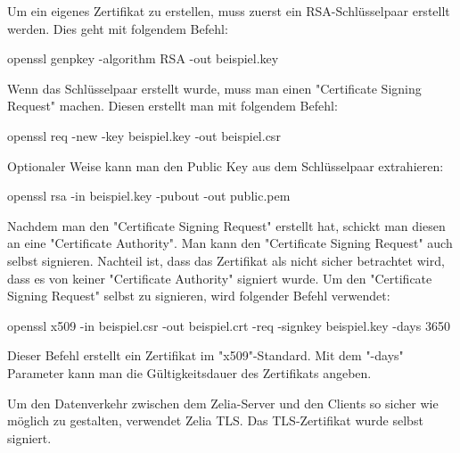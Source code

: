 
Um ein eigenes Zertifikat zu erstellen, muss zuerst ein RSA-Schlüsselpaar erstellt werden. Dies geht mit folgendem Befehl:

{\ttfamily openssl genpkey -algorithm RSA -out beispiel.key}

Wenn das Schlüsselpaar erstellt wurde, muss man einen "Certificate Signing Request" machen. Diesen erstellt man mit folgendem Befehl: 

{\ttfamily openssl req -new -key beispiel.key -out beispiel.csr}

Optionaler Weise kann man den Public Key aus dem Schlüsselpaar extrahieren:

{\ttfamily openssl rsa -in beispiel.key -pubout -out public.pem}

Nachdem man den "Certificate Signing Request" erstellt hat, schickt man diesen an eine "Certificate Authority". Man kann den "Certificate Signing Request" auch selbst signieren. Nachteil ist, dass das Zertifikat als nicht sicher betrachtet wird, dass es von keiner "Certificate Authority" signiert wurde. Um den "Certificate Signing Request" selbst zu signieren, wird folgender Befehl verwendet: 

{\ttfamily openssl x509 -in beispiel.csr -out beispiel.crt -req -signkey beispiel.key -days 3650}

Dieser Befehl erstellt ein Zertifikat im "x509"-Standard. Mit dem "-days" Parameter kann man die Gültigkeitsdauer des Zertifikats angeben.


Um den Datenverkehr zwischen dem Zelia-Server und den Clients so sicher wie möglich zu gestalten, verwendet Zelia TLS. Das TLS-Zertifikat wurde selbst signiert.
